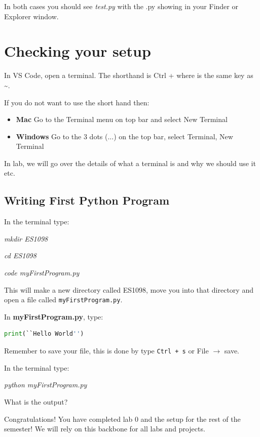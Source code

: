 \documentclass[12pt]{article}
\begin{document}
In both cases you should see \textit{test.py} with the .py showing in your Finder or Explorer window. 

\section{Checking your setup}
In VS Code, open a terminal. The shorthand is Ctrl + \textasciigrave where  \textasciigrave is the same key as \textasciitilde{}.

If you do not want to use the short hand then: 
\begin{itemize}
\item \textbf{Mac} Go to the Terminal menu on top bar and select New Terminal
\item \textbf{Windows} Go to the 3 dots (...) on the top bar, select Terminal, New Terminal
\end{itemize}
In lab, we will go over the details of what a terminal is and why we should use it etc. 

\vspace{5mm}

\subsection{Writing First Python Program}
In the terminal type:

\vspace{5mm}
  \textit{mkdir ES1098}
  
  \textit{cd ES1098}
  
  \textit{code myFirstProgram.py}
  \vspace{5mm}
  
This will make a new directory called ES1098, move you into that directory and open a file called \texttt{myFirstProgram.py}. 

In \textbf{myFirstProgram.py}, type:
\begin{lstlisting}[language=Python]
print(``Hello World'')
\end{lstlisting}

Remember to save your file, this is done by type \texttt{Ctrl + s} or File $\rightarrow$ save.

In the terminal type:
\vspace{5mm}

\textit{python myFirstProgram.py}

\vspace{5mm}
What is the output?

\vspace{5mm}
Congratulations! You have completed lab 0 and the setup for the rest of the semester! We will rely on this backbone for all labs and projects.
\end{document}
